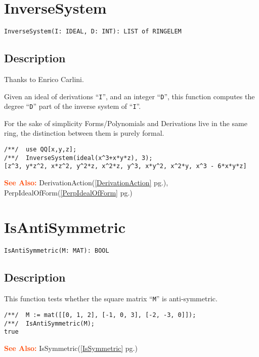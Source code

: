 \documentclass[a4paper]{mybook}
\newenvironment{command}{}{} %
\newcommand\SeeAlso{\par\textcolor{OrangeRed}{\textbf{\large See Also: }}}
\begin{document}
\section{InverseSystem}
\label{InverseSystem}
\begin{command} %


\begin{Verbatim}[label=syntax, rulecolor=\color{MidnightBlue},
frame=single]
InverseSystem(I: IDEAL, D: INT): LIST of RINGELEM
\end{Verbatim}


\subsection*{Description}

Thanks to Enrico Carlini.
\par 
Given an ideal of derivations ``\verb&I&'', and an integer ``\verb&D&'', this function
computes the degree ``\verb&D&'' part of the inverse system of ``\verb&I&''.
\par 
For the sake of simplicity Forms/Polynomials and Derivations live in
the same ring, the distinction between them is purely formal.
\begin{Verbatim}[label=example, rulecolor=\color{PineGreen}, frame=single]
/**/  use QQ[x,y,z];
/**/  InverseSystem(ideal(x^3+x*y*z), 3);
[z^3, y*z^2, x*z^2, y^2*z, x^2*z, y^3, x*y^2, x^2*y, x^3 - 6*x*y*z]
\end{Verbatim}


\SeeAlso %
  DerivationAction(\ref{DerivationAction} pg.\pageref{DerivationAction}), 
    PerpIdealOfForm(\ref{PerpIdealOfForm} pg.\pageref{PerpIdealOfForm})
\end{command} %

\section{IsAntiSymmetric}
\label{IsAntiSymmetric}
\begin{command} %


\begin{Verbatim}[label=syntax, rulecolor=\color{MidnightBlue},
frame=single]
IsAntiSymmetric(M: MAT): BOOL
\end{Verbatim}


\subsection*{Description}

This function tests whether the square matrix ``\verb&M&'' is anti-symmetric.
\begin{Verbatim}[label=example, rulecolor=\color{PineGreen}, frame=single]
/**/  M := mat([[0, 1, 2], [-1, 0, 3], [-2, -3, 0]]);
/**/  IsAntiSymmetric(M);
true
\end{Verbatim}


\SeeAlso %
  IsSymmetric(\ref{IsSymmetric} pg.\pageref{IsSymmetric})
\end{command} %
\end{document}
